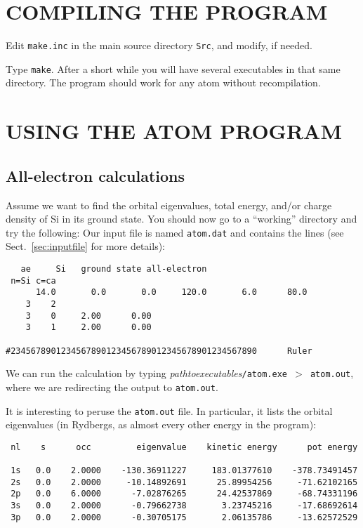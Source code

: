 \documentclass[11pt]{article}
\begin{document}
\section{COMPILING THE PROGRAM}

Edit {\tt make.inc} in the main source directory {\tt Src}, and modify, if
needed.

Type {\tt make}. After a short while you will have several executables
in that same directory. The program should work for any atom
without recompilation. 


\section{USING THE ATOM PROGRAM}


\subsection{All-electron calculations}

Assume we want to find the orbital eigenvalues, total energy, and/or
charge density of Si in its ground state. You should now go to a ``working'' 
directory and try the following:  Our
input file is named {\tt atom.dat} and contains the lines (see 
Sect.~\ref{sec:inputfile} for more details):

\begin{verbatim}
   ae     Si   ground state all-electron
 n=Si c=ca 
      14.0       0.0       0.0     120.0       6.0      80.0
    3    2
    3    0     2.00      0.00
    3    1     2.00      0.00

#2345678901234567890123456789012345678901234567890      Ruler
\end{verbatim}

We can run the calculation by typing
\textit{pathtoexecutables}\texttt{/atom.exe $>$ atom.out},
where we are redirecting the output to \texttt{atom.out}.


It is interesting to peruse the \texttt{atom.out} file.
In particular, it lists the orbital eigenvalues (in Rydbergs, as almost
every other energy in the program):

\begin{verbatim}
 nl    s      occ         eigenvalue    kinetic energy      pot energy

 1s   0.0    2.0000    -130.36911227     183.01377610    -378.73491457
 2s   0.0    2.0000     -10.14892691      25.89954256     -71.62102165
 2p   0.0    6.0000      -7.02876265      24.42537869     -68.74331196
 3s   0.0    2.0000      -0.79662738       3.23745216     -17.68692614
 3p   0.0    2.0000      -0.30705175       2.06135786     -13.62572529
\end{verbatim}
\end{document}
